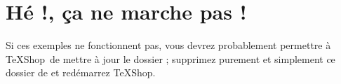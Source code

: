 \documentclass[11pt,french]{article}
\newcommand{\TS}{\textsf{\TeX Shop}}
\begin{document}
\section*{Hé !, ça ne marche pas !}

%

Si ces exemples ne fonctionnent pas, vous devrez probablement permettre à \TS\ de mettre à jour le dossier  ; supprimez purement et simplement ce dossier de  et redémarrez \TS.

\end{document}
